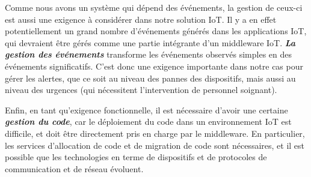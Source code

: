 Comme nous avons un système qui dépend des événements, la gestion de ceux-ci est aussi une exigence à considérer dans notre solution IoT. Il y a en effet potentiellement un grand nombre d'événements générés dans les applications IoT, qui devraient être gérés comme une partie intégrante d'un middleware IoT.  \textbf{\textit{La gestion des événements}} transforme les événements observés simples en des événements significatifs. C'est donc une exigence importante dans notre cas pour gérer les alertes, que ce soit au niveau des pannes des dispositifs, mais aussi au niveau des urgences (qui nécessitent l’intervention de personnel soignant).

Enfin, en tant qu'exigence fonctionnelle, il est nécessaire d'avoir une certaine \textbf{\textit{gestion du code}}, car le déploiement du code dans un environnement IoT est difficile, et doit être directement pris en charge par le middleware. En particulier, les services d'allocation de code et de migration de code sont nécessaires, et il est possible que les technologies en terme de dispositifs et de protocoles de communication et de réseau évoluent.